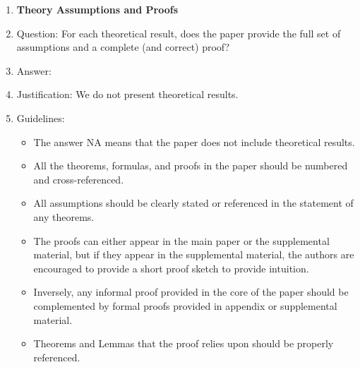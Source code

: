 \documentclass{article}
\begin{document}
\begin{enumerate}
\item {\bf Theory Assumptions and Proofs}
    \item[] Question: For each theoretical result, does the paper provide the full set of assumptions and a complete (and correct) proof?
    \item[] Answer: \answerNA{} %
    \item[] Justification: We do not present theoretical results.
    \item[] Guidelines:
    \begin{itemize}
        \item The answer NA means that the paper does not include theoretical results. 
        \item All the theorems, formulas, and proofs in the paper should be numbered and cross-referenced.
        \item All assumptions should be clearly stated or referenced in the statement of any theorems.
        \item The proofs can either appear in the main paper or the supplemental material, but if they appear in the supplemental material, the authors are encouraged to provide a short proof sketch to provide intuition. 
        \item Inversely, any informal proof provided in the core of the paper should be complemented by formal proofs provided in appendix or supplemental material.
        \item Theorems and Lemmas that the proof relies upon should be properly referenced. 
    \end{itemize}


\end{enumerate}
\end{document}

